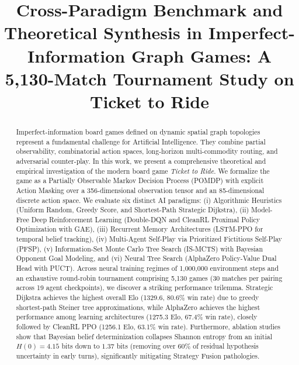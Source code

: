 \documentclass[conference,10pt]{IEEEtran}
\begin{document}
\title{Cross-Paradigm Benchmark and Theoretical Synthesis in Imperfect-Information Graph Games: A 5,130-Match Tournament Study on Ticket to Ride}

\author{
}

\maketitle

\begin{abstract}
Imperfect-information board games defined on dynamic spatial graph topologies represent a fundamental challenge for Artificial Intelligence. They combine partial observability, combinatorial action spaces, long-horizon multi-commodity routing, and adversarial counter-play. In this work, we present a comprehensive theoretical and empirical investigation of the modern board game \textit{Ticket to Ride}. We formalize the game as a Partially Observable Markov Decision Process (POMDP) with explicit Action Masking over a 356-dimensional observation tensor and an 85-dimensional discrete action space. We evaluate six distinct AI paradigms: (i) Algorithmic Heuristics (Uniform Random, Greedy Score, and Shortest-Path Strategic Dijkstra), (ii) Model-Free Deep Reinforcement Learning (Double-DQN and CleanRL Proximal Policy Optimization with GAE), (iii) Recurrent Memory Architectures (LSTM-PPO for temporal belief tracking), (iv) Multi-Agent Self-Play via Prioritized Fictitious Self-Play (PFSP), (v) Information-Set Monte Carlo Tree Search (IS-MCTS) with Bayesian Opponent Goal Modeling, and (vi) Neural Tree Search (AlphaZero Policy-Value Dual Head with PUCT). Across neural training regimes of 1,000,000 environment steps and an exhaustive round-robin tournament comprising 5,130 games (30 matches per pairing across 19 agent checkpoints), we discover a striking performance trilemma. Strategic Dijkstra achieves the highest overall Elo (1329.6, 80.6\% win rate) due to greedy shortest-path Steiner tree approximations, while AlphaZero achieves the highest performance among learning architectures (1275.3 Elo, 67.4\% win rate), closely followed by CleanRL PPO (1256.1 Elo, 63.1\% win rate). Furthermore, ablation studies show that Bayesian belief determinization collapses Shannon entropy from an initial $H(0) = 4.15$ bits down to $1.37$ bits (removing over 60\% of residual hypothesis uncertainty in early turns), significantly mitigating Strategy Fusion pathologies.
\end{abstract}
\end{document}
